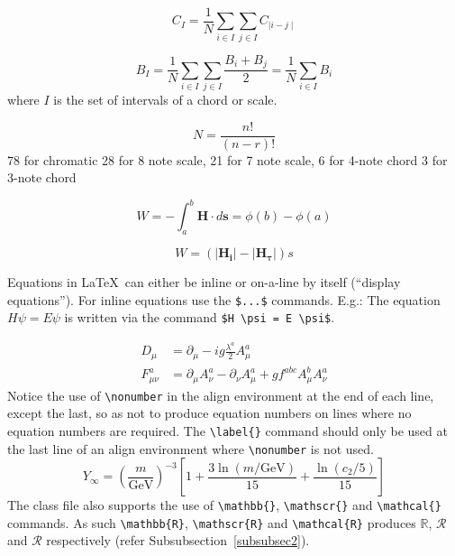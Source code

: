 \documentclass[sn-mathphys]{sn-jnl}%
\begin{document}
\begin{equation}
  C_{I}=\frac{1}{N}\sum\limits_{i \in I}\sum\limits_{j \in I} C_{\mid i-j \mid}  \label{consonanceChordEq}
\end{equation}

\begin{equation}
  B_{I}=\frac{1}{N}\sum\limits_{i \in I}\sum\limits_{j \in I}\frac{ B_{i}+B_{j}}{2}=\frac{1}{N}\sum\limits_{i \in I}B_{i}  \label{brillianceChordEq}
\end{equation}
where $I$ is the set of intervals of a chord or scale.

\begin{equation}
  N=\frac{n!}{(n-r)!}  \label{combinationsEq}
\end{equation}
78 for chromatic
28 for 8 note scale,
21 for 7 note scale,
6 for 4-note chord
3 for 3-note chord

\begin{equation}
  W=-\int_{a}^{b}\boldsymbol{H \cdot } d\boldsymbol{s} = \phi(b) - \phi(a)    \label{cadentialGravityProofEq}
\end{equation}

\begin{equation}
  W =   \left( \left| \boldsymbol{H_{i}} \right| - \left|  \boldsymbol{H_{\tau}} \right| \right)s  \label{cadentialGravityEq}
\end{equation}



Equations in \LaTeX\ can either be inline or on-a-line by itself (``display equations''). For
inline equations use the \verb+$...$+ commands. E.g.: The equation
$H\psi = E \psi$ is written via the command \verb+$H \psi = E \psi$+.

\begin{align}
D_\mu &=  \partial_\mu - ig \frac{\lambda^a}{2} A^a_\mu \nonumber \\
F^a_{\mu\nu} &= \partial_\mu A^a_\nu - \partial_\nu A^a_\mu + g f^{abc} A^b_\mu A^a_\nu \label{eq2}
\end{align}
Notice the use of \verb+\nonumber+ in the align environment at the end
of each line, except the last, so as not to produce equation numbers on
lines where no equation numbers are required. The \verb+\label{}+ command
should only be used at the last line of an align environment where
\verb+\nonumber+ is not used.
\begin{equation}
Y_\infty = \left( \frac{m}{\textrm{GeV}} \right)^{-3}
    \left[ 1 + \frac{3 \ln(m/\textrm{GeV})}{15}
    + \frac{\ln(c_2/5)}{15} \right]
\end{equation}
The class file also supports the use of \verb+\mathbb{}+, \verb+\mathscr{}+ and
\verb+\mathcal{}+ commands. As such \verb+\mathbb{R}+, \verb+\mathscr{R}+
and \verb+\mathcal{R}+ produces $\mathbb{R}$, $\mathscr{R}$ and $\mathcal{R}$
respectively (refer Subsubsection~\ref{subsubsec2}).
\end{document}

